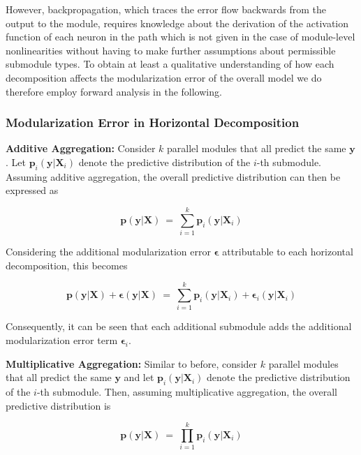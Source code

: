 However, backpropagation, which traces the error flow backwards from the output to the module, requires knowledge about the derivation of the activation function of each neuron in the path which is not given in the case of module-level nonlinearities without having to make further assumptions about permissible submodule types. To obtain at least a qualitative understanding of how each decomposition affects the modularization error of the overall model we do therefore employ forward analysis in the following.

\pagebreak

\subsubsection{Modularization Error in Horizontal Decomposition}

\textbf{Additive Aggregation:} Consider $k$ parallel modules that all predict the same $\textbf{y}$. Let $\textbf{p}_{i}(\textbf{y}|\textbf{X}_i)$ denote the predictive distribution of the $i$-th submodule. Assuming additive aggregation, the overall predictive distribution can then be expressed as

\begin{equation}
\label{eq:compnet_error_propagation_add_dist}
    \textbf{p}(\textbf{y}|\textbf{X})\ =\ \sum_{i=1}^k\textbf{p}_i(\textbf{y}|\textbf{X}_i)
\end{equation}

Considering the additional modularization error $\boldsymbol{\epsilon}$ attributable to each horizontal decomposition, this becomes

\begin{equation}
\label{eq:compnet_error_propagation_add_dist_err}
    \textbf{p}(\textbf{y}|\textbf{X})+\boldsymbol{\epsilon}(\textbf{y}|\textbf{X})\ =\ \sum_{i=1}^k\textbf{p}_i(\textbf{y}|\textbf{X}_i)+\boldsymbol{\epsilon}_i(\textbf{y}|\textbf{X}_i)
\end{equation}

Consequently, it can be seen that each additional submodule adds the additional modularization error term $\boldsymbol{\epsilon}_i$.

\textbf{Multiplicative Aggregation:} Similar to before, consider $k$ parallel modules that all predict the same $\textbf{y}$ and let $\textbf{p}_{i}(\textbf{y}|\textbf{X}_i)$ denote the predictive distribution of the $i$-th submodule. Then, assuming multiplicative aggregation, the overall predictive distribution is

\begin{equation}
\label{eq:compnet_error_propagation_mult_dist}
    \textbf{p}(\textbf{y}|\textbf{X})\ =\ \prod_{i=1}^k\textbf{p}_i(\textbf{y}|\textbf{X}_i)
\end{equation}

